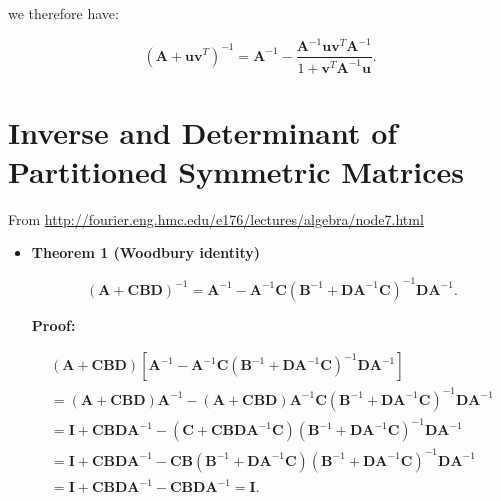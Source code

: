 \documentclass[10pt,b5paper,titlepage]{book}
\begin{document}
we therefore have:

\begin{equation}
    (\mathbf{A} + \mathbf{u}\mathbf{v}^{T})^{-1}
    = \mathbf{A}^{-1}
    - \frac{\mathbf{A}^{-1}\mathbf{u}\mathbf{v}^{T}\mathbf{A}^{-1}}
    {1 + \mathbf{v}^{T}\mathbf{A}^{-1}\mathbf{u}}
.\end{equation}



\chapter{Inverse and Determinant of Partitioned Symmetric Matrices}
From \url{http://fourier.eng.hmc.edu/e176/lectures/algebra/node7.html}\\

\begin{itemize}
    \item \textbf{Theorem 1 (Woodbury identity)}

        \begin{equation}
            (\mathbf{A} + \mathbf{C} \mathbf{B} \mathbf{D})^{-1} =
            \mathbf{A}^{-1} - \mathbf{A}^{-1} \mathbf{C} (\mathbf{B}^{-1} + \mathbf{D} \mathbf{A}^{-1} \mathbf{C})^{-1} \mathbf{D} \mathbf{A}^{-1}
        .\end{equation}

        \textbf{Proof:}

        \begin{equation}
            \begin{array}{l}
                (\mathbf{A} + \mathbf{C} \mathbf{B} \mathbf{D}) [\mathbf{A}^{-1} - \mathbf{A}^{-1} \mathbf{C} (\mathbf{B}^{-1} + \mathbf{D} \mathbf{A}^{-1} \mathbf{C})^{-1} \mathbf{D} \mathbf{A}^{-1}]\\
                = (\mathbf{A} + \mathbf{C} \mathbf{B} \mathbf{D}) \mathbf{A}^{-1} - (\mathbf{A} + \mathbf{C} \mathbf{B} \mathbf{D}) \mathbf{A}^{-1} \mathbf{C} ( \mathbf{B}^{-1} + \mathbf{D} \mathbf{A}^{-1} \mathbf{C})^{-1} \mathbf{D} \mathbf{A}^{-1}\\
                = \mathbf{I} + \mathbf{C} \mathbf{B} \mathbf{D} \mathbf{A}^{-1} - (\mathbf{C} + \mathbf{C} \mathbf{B} \mathbf{D} \mathbf{A}^{-1} \mathbf{C}) (\mathbf{B}^{-1} + \mathbf{D} \mathbf{A}^{-1} \mathbf{C})^{-1} \mathbf{D} \mathbf{A}^{-1}\\
                = \mathbf{I} + \mathbf{C} \mathbf{B} \mathbf{D} \mathbf{A}^{-1} - \mathbf{C} \mathbf{B} (\mathbf{B}^{-1} + \mathbf{D} \mathbf{A}^{-1} \mathbf{C}) (\mathbf{B}^{-1} + \mathbf{D} \mathbf{A}^{-1} \mathbf{C})^{-1} \mathbf{D} \mathbf{A}^{-1}\\
                = \mathbf{I} + \mathbf{C} \mathbf{B} \mathbf{D} \mathbf{A}^{-1} - \mathbf{C} \mathbf{B} \mathbf{D} \mathbf{A}^{-1} = \mathbf{I}.
            \end{array}
        \end{equation}


\end{itemize}
\end{document}
